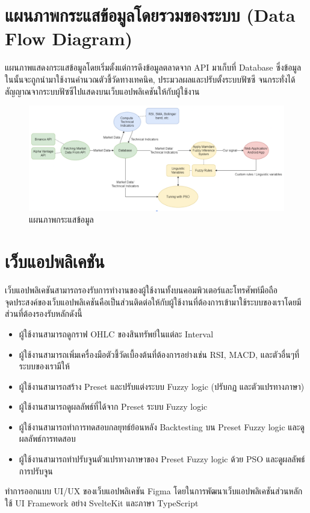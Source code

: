 \section{แผนภาพกระแสข้อมูลโดยรวมของระบบ (Data Flow Diagram)}
แผนภาพแสดงกระแสข้อมูลโดยเริ่มตั้งแต่การดึงข้อมูลตลาดจาก API มาเก็บที่ Database ซึ่งข้อมูลในนั้นจะถูกนำมาใช้งานคำนวณตัวชี้วัดทางเทคนิค, ประมวลผลและปรับตั้งระบบฟัซซี จนกระทั่งได้สัญญาณจากระบบฟัซซีไปแสดงบนเว็บแอปพลิเคชันให้กับผู้ใช้งาน
\begin{figure}[ht]
    \centering
    \includegraphics[scale=0.3]{images/overview.png}
    \caption{แผนภาพกระแสข้อมูล}
    \label{fig:11}
\end{figure}

\section{เว็บแอปพลิเคชัน}
เว็บแอปพลิเคชันสามารถรองรับการทำงานของผู้ใช้งานทั้งบนคอมพิวเตอร์และโทรศัพท์มือถือ \\
จุดประสงค์ของเว็บแอปพลิเคชันคือเป็นส่วนติดต่อให้กับผู้ใช้งานที่ต้องการเข้ามาใช้ระบบของเราโดยมีส่วนที่ต้องรองรับหลักดังนี้
\begin{itemize}
    \item ผู้ใช้งานสามารถดูกราฟ OHLC ของสินทรัพย์ในแต่ละ Interval
    \item ผู้ใช้งานสามารถเพิ่มเครื่องมือตัวชี้วัดเบื้องต้นที่ต้องการอย่างเช่น RSI, MACD, และตัวอื่นๆที่ระบบของเรามีให้
    \item ผู้ใช้งานสามารถสร้าง Preset และปรับแต่งระบบ Fuzzy logic (ปรับกฏ และตัวแปรทางภาษา)
    \item ผู้ใช้งานสามารถดูผลลัพธ์ที่ได้จาก Preset ระบบ Fuzzy logic
    \item ผู้ใช้งานสามารถทำการทดสอบกลยุทธ์ย้อนหลัง Backtesting บน Preset Fuzzy logic และดูผลลัพธ์การทดสอบ
    \item ผู้ใช้งานสามารถทำปรับจูนตัวแปรทางภาษาของ Preset Fuzzy logic ด้วย PSO และดูผลลัพธ์การปรับจูน
\end{itemize}
ทำการออกแบบ UI/UX ของเว็บแอปพลิเคชัน Figma
โดยในการพัฒนาเว็บแอปพลิเคชันส่วนหลักใช้ UI Framework อย่าง SvelteKit และภาษา TypeScript

